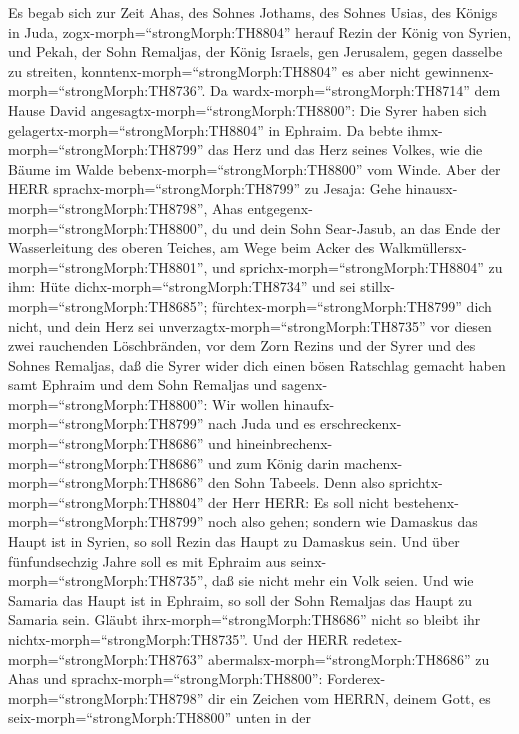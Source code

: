  Es begab sich zur Zeit Ahas, des Sohnes Jothams, des Sohnes
Usias, des Königs in Juda, zogx-morph=``strongMorph:TH8804'' herauf
Rezin der König von Syrien, und Pekah, der Sohn Remaljas, der König
Israels, gen Jerusalem, gegen dasselbe zu streiten,
konntenx-morph=``strongMorph:TH8804'' es aber nicht
gewinnenx-morph=``strongMorph:TH8736''.  Da
wardx-morph=``strongMorph:TH8714'' dem Hause David
angesagtx-morph=``strongMorph:TH8800'': Die Syrer haben sich
gelagertx-morph=``strongMorph:TH8804'' in Ephraim. Da bebte
ihmx-morph=``strongMorph:TH8799'' das Herz und das Herz seines Volkes,
wie die Bäume im Walde bebenx-morph=``strongMorph:TH8800'' vom Winde.
 Aber der HERR sprachx-morph=``strongMorph:TH8799'' zu
Jesaja: Gehe hinausx-morph=``strongMorph:TH8798'', Ahas
entgegenx-morph=``strongMorph:TH8800'', du und dein Sohn Sear-Jasub, an
das Ende der Wasserleitung des oberen Teiches, am Wege beim Acker des
Walkmüllersx-morph=``strongMorph:TH8801'',  und
sprichx-morph=``strongMorph:TH8804'' zu ihm: Hüte
dichx-morph=``strongMorph:TH8734'' und sei
stillx-morph=``strongMorph:TH8685'';
fürchtex-morph=``strongMorph:TH8799'' dich nicht, und dein Herz sei
unverzagtx-morph=``strongMorph:TH8735'' vor diesen zwei rauchenden
Löschbränden, vor dem Zorn Rezins und der Syrer und des Sohnes Remaljas,
 daß die Syrer wider dich einen bösen Ratschlag gemacht
haben samt Ephraim und dem Sohn Remaljas und
sagenx-morph=``strongMorph:TH8800'':  Wir wollen
hinaufx-morph=``strongMorph:TH8799'' nach Juda und es
erschreckenx-morph=``strongMorph:TH8686'' und
hineinbrechenx-morph=``strongMorph:TH8686'' und zum König darin
machenx-morph=``strongMorph:TH8686'' den Sohn Tabeels.  Denn
also sprichtx-morph=``strongMorph:TH8804'' der Herr HERR: Es soll nicht
bestehenx-morph=``strongMorph:TH8799'' noch also gehen; 
sondern wie Damaskus das Haupt ist in Syrien, so soll Rezin das Haupt zu
Damaskus sein. Und über fünfundsechzig Jahre soll es mit Ephraim aus
seinx-morph=``strongMorph:TH8735'', daß sie nicht mehr ein Volk seien.
 Und wie Samaria das Haupt ist in Ephraim, so soll der Sohn
Remaljas das Haupt zu Samaria sein. Gläubt
ihrx-morph=``strongMorph:TH8686'' nicht so bleibt ihr
nichtx-morph=``strongMorph:TH8735''.  Und der HERR
redetex-morph=``strongMorph:TH8763''
abermalsx-morph=``strongMorph:TH8686'' zu Ahas und
sprachx-morph=``strongMorph:TH8800'': 
Forderex-morph=``strongMorph:TH8798'' dir ein Zeichen vom HERRN, deinem
Gott, es seix-morph=``strongMorph:TH8800'' unten in der
